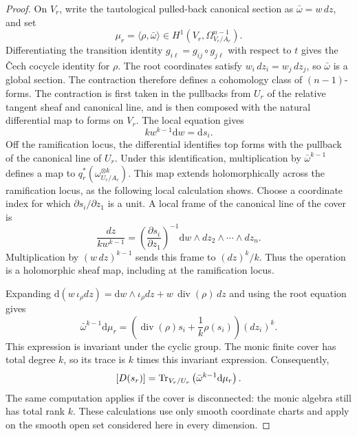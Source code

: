 \documentclass[11pt,a4paper]{article}
\theoremstyle{definition}\newtheorem{definition}[theorem]{Definition}
\theoremstyle{remark}\newtheorem*{remark}{Remark}
\newcommand{\dd}{\mathrm d}
\begin{document}
\begin{proof}
On $V_r$, write the tautological pulled-back canonical section as
$\bar\omega=w\,dz$, and set
\[
 \mu_r=\langle\rho,\bar\omega\rangle
 \in H^1(V_r,\Omega^{n-1}_{V_r/A_r}).
\]
Differentiating the transition identity
$g_{i\ell}=g_{ij}\circ g_{j\ell}$ with respect to $t$ gives the
\v{C}ech cocycle identity for $\rho$.
The root coordinates satisfy $w_i\,dz_i=w_j\,dz_j$, so
$\bar\omega$ is a global section. The contraction therefore defines
a cohomology class of $(n-1)$-forms.
The contraction is first taken in the pullbacks from $U_r$ of the
relative tangent sheaf and canonical line, and is then composed with
the natural differential map to forms on $V_r$.
The local equation gives
\[
 kw^{k-1}\dd w=\dd s_i.
\]
Off the ramification locus, the differential identifies top forms
with the pullback of the canonical line of $U_r$. Under this
identification, multiplication by $\bar\omega^{k-1}$ defines a map
to $q_r^*(\omega_{U_r/A_r}^{\otimes k})$.
This map extends holomorphically across the ramification locus,
as the following local calculation shows.
Choose a coordinate index for which $\partial s_i/\partial z_1$
is a unit. A local frame of the canonical line of the cover is
\begin{equation}\label{eq:ext-branch-frame}
 \frac{dz}{kw^{k-1}}
 =\left(\frac{\partial s_i}{\partial z_1}\right)^{-1}
 \dd w\wedge dz_2\wedge\cdots\wedge dz_n.
\end{equation}
Multiplication by $(w\,dz)^{k-1}$ sends this frame to $(dz)^k/k$.
Thus the operation is a holomorphic sheaf map, including at the
ramification locus.

Expanding
$\dd(w\,\iota_\rho dz)=\dd w\wedge\iota_\rho dz
+w\,\operatorname{div}(\rho)\,dz$
and using the root equation gives
\begin{equation}\label{eq:ext-trace-local}
 \bar\omega^{k-1}\dd\mu_r
 =\left(\operatorname{div}(\rho)s_i+
          \frac1k\rho(s_i)\right)(dz_i)^k.
\end{equation}
This expression is invariant under the cyclic group.
The monic finite cover has total degree $k$, so its trace is $k$ times
this invariant expression. Consequently,
\begin{equation}\label{eq:ext-trace-obstruction}
 [D(s_r)]
 =\Tr_{V_r/U_r}\left(\bar\omega^{k-1}\dd\mu_r\right).
\end{equation}
The same computation applies if the cover is disconnected: the monic
algebra still has total rank $k$.
These calculations use only smooth coordinate charts and apply on the
smooth open set considered here in every dimension.


\end{proof}
\end{document}
